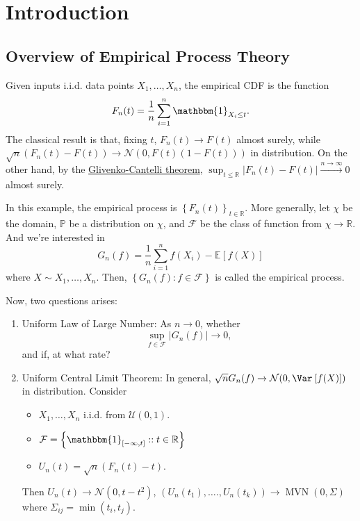 \chapter{Introduction}
\section{Overview of Empirical Process Theory}
Given inputs i.i.d. data points \(X_1, \dots , X_n\), the empirical CDF is the function
\[
	F_n(t) = \frac{1}{n} \sum_{i=1}^{n} \mathbbm{1}_{X_i \leq t} .
\]
The classical result is that, fixing \(t\), \(F_n(t) \to F(t)\) almost surely, while \(\sqrt{n} (F_n(t) - F(t)) \to \mathcal{N} (0, F(t)(1 - F(t)))\) in distribution. On the other hand, by the \href{https://en.wikipedia.org/wiki/Glivenko%E2%80%93Cantelli_theorem}{Glivenko-Cantelli theorem}, \(\sup _{t \leq\mathbb{R} } \vert F_n(t) - F(t) \vert \overset{n \to \infty }{\to } 0\) almost surely.

In this example, the empirical process is \(\left\{ F_n(t) \right\}_{t\in \mathbb{R} } \). More generally, let \(\chi \) be the domain, \(\mathbb{P} \) be a distribution on \(\chi \), and \(\mathcal{F} \) be the class of function from \(\chi \to \mathbb{R} \). And we're interested in
\[
	G_n(f) = \frac{1}{n} \sum_{i=1}^{n} f(X_i) - \mathbb{E}_{}\left[f(X) \right]
\]
where \(X \sim X_1, \dots , X_n\). Then, \(\left\{ G_n(f) \colon f\in \mathcal{F}  \right\} \) is called the empirical process.

Now, two questions arises:
\begin{enumerate}
	\item Uniform Law of Large Number: As \(n \to 0\), whether
	      \[
		      \sup _{f\in \mathcal{F} } \vert G_n(f) \vert \to 0,
	      \]
	      and if, at what rate?
	\item Uniform Central Limit Theorem: In general, \(\sqrt{n} G_n(f) \to \mathcal{N} (0, \Var_{}\left[f(X) \right] )\) in distribution. Consider
	      \begin{itemize}
		      \item \(X_1, \dots , X_n\) i.i.d. from \(\mathcal{U} (0, 1)\).
		      \item \(\mathcal{F} = \left\{ \mathbbm{1}_{[-\infty , t]} ::t\in \mathbb{R}  \right\} \)
		      \item \(U_n(t) = \sqrt{n} (F_n(t) - t) \).
	      \end{itemize}
	      Then \(U_n(t) \to \mathcal{N} (0, t - t^2)\), \((U_n(t_1), \dots ., U_n(t_k)) \to \mathop{\mathrm{MVN}}(0, \Sigma ) \) where \(\Sigma _{ij} = \min (t_i, t_j)\).
\end{enumerate}

